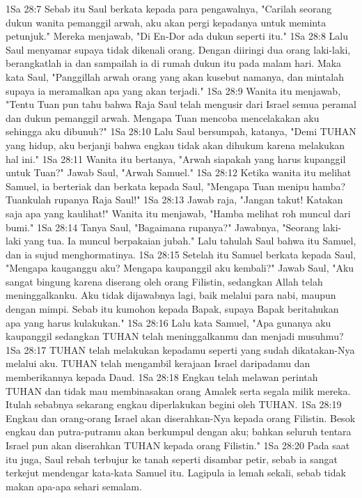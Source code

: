 1Sa 28:7  Sebab itu Saul berkata kepada para pengawalnya, "Carilah seorang dukun wanita pemanggil arwah, aku akan pergi kepadanya untuk meminta petunjuk." Mereka menjawab, "Di En-Dor ada dukun seperti itu."
1Sa 28:8  Lalu Saul menyamar supaya tidak dikenali orang. Dengan diiringi dua orang laki-laki, berangkatlah ia dan sampailah ia di rumah dukun itu pada malam hari. Maka kata Saul, "Panggillah arwah orang yang akan kusebut namanya, dan mintalah supaya ia meramalkan apa yang akan terjadi."
1Sa 28:9  Wanita itu menjawab, "Tentu Tuan pun tahu bahwa Raja Saul telah mengusir dari Israel semua peramal dan dukun pemanggil arwah. Mengapa Tuan mencoba mencelakakan aku sehingga aku dibunuh?"
1Sa 28:10  Lalu Saul bersumpah, katanya, "Demi TUHAN yang hidup, aku berjanji bahwa engkau tidak akan dihukum karena melakukan hal ini."
1Sa 28:11  Wanita itu bertanya, "Arwah siapakah yang harus kupanggil untuk Tuan?" Jawab Saul, "Arwah Samuel."
1Sa 28:12  Ketika wanita itu melihat Samuel, ia berteriak dan berkata kepada Saul, "Mengapa Tuan menipu hamba? Tuankulah rupanya Raja Saul!"
1Sa 28:13  Jawab raja, "Jangan takut! Katakan saja apa yang kaulihat!" Wanita itu menjawab, "Hamba melihat roh muncul dari bumi."
1Sa 28:14  Tanya Saul, "Bagaimana rupanya?" Jawabnya, "Seorang laki-laki yang tua. Ia muncul berpakaian jubah." Lalu tahulah Saul bahwa itu Samuel, dan ia sujud menghormatinya.
1Sa 28:15  Setelah itu Samuel berkata kepada Saul, "Mengapa kauganggu aku? Mengapa kaupanggil aku kembali?" Jawab Saul, "Aku sangat bingung karena diserang oleh orang Filistin, sedangkan Allah telah meninggalkanku. Aku tidak dijawabnya lagi, baik melalui para nabi, maupun dengan mimpi. Sebab itu kumohon kepada Bapak, supaya Bapak beritahukan apa yang harus kulakukan."
1Sa 28:16  Lalu kata Samuel, "Apa gunanya aku kaupanggil sedangkan TUHAN telah meninggalkanmu dan menjadi musuhmu?
1Sa 28:17  TUHAN telah melakukan kepadamu seperti yang sudah dikatakan-Nya melalui aku. TUHAN telah mengambil kerajaan Israel daripadamu dan memberikannya kepada Daud.
1Sa 28:18  Engkau telah melawan perintah TUHAN dan tidak mau membinasakan orang Amalek serta segala milik mereka. Itulah sebabnya sekarang engkau diperlakukan begini oleh TUHAN.
1Sa 28:19  Engkau dan orang-orang Israel akan diserahkan-Nya kepada orang Filistin. Besok engkau dan putra-putramu akan berkumpul dengan aku; bahkan seluruh tentara Israel pun akan diserahkan TUHAN kepada orang Filistin."
1Sa 28:20  Pada saat itu juga, Saul rebah terbujur ke tanah seperti disambar petir, sebab ia sangat terkejut mendengar kata-kata Samuel itu. Lagipula ia lemah sekali, sebab tidak makan apa-apa sehari semalam.
